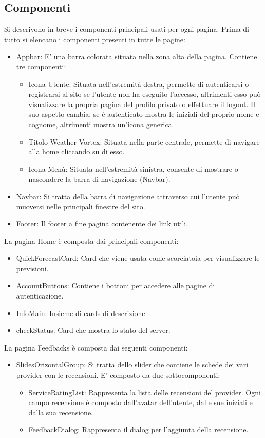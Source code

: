 \subsection{Componenti}
Si descrivono in breve i componenti principali usati per ogni pagina.
Prima di tutto si elencano i componenti presenti in tutte le pagine:
\begin{itemize}
    \item Appbar:  E' una barra colorata situata nella zona alta della pagina. Contiene tre componenti:
    \begin{itemize}
    \item Icona Utente: Situata nell'estremità destra, permette di autenticarsi o registrarsi al sito se l'utente non ha eseguito l'accesso, altrimenti esso può visualizzare la propria pagina del profilo privato o effettuare il logout. Il suo aspetto cambia: se è autenticato mostra le iniziali del proprio nome e cognome, altrimenti mostra un'icona generica. 
    \item Titolo Weather Vortex: Situata nella parte centrale, permette di navigare alla home cliccando su di esso.
    \item Icona Menù: Situata nell'estremità sinistra, consente di mostrare o nascondere la barra di navigazione (Navbar).
    \end{itemize}
    \item Navbar: Si tratta della barra di navigazione attraverso cui l'utente può muoversi nelle principali finestre del sito.
    \item Footer: Il footer a fine pagina contenente dei link utili.
\end{itemize}
La pagina Home è composta dai principali componenti:
\begin{itemize}
    \item QuickForecastCard: Card che viene usata come scorciatoia per visualizzare le previsioni. 
    \item AccountButtons: Contiene i bottoni per accedere alle pagine di autenticazione.
    \item InfoMain: Insieme di cards di descrizione
    \item checkStatus: Card che mostra lo stato del server.
\end{itemize}
La pagina Feedbacks è composta dai seguenti componenti:
\begin{itemize}
    \item SlidesOrizontalGroup: Si tratta dello slider che contiene le schede dei vari provider con le recensioni. E' composto da due sottocomponenti:
    \begin{itemize}
        \item ServiceRatingList: Rappresenta la lista delle recensioni del provider. Ogni campo recensione è composto dall'avatar dell'utente, dalle sue iniziali e dalla sua recensione.
        \item FeedbackDialog: Rappresenta il dialog per l'aggiunta della recensione.
    \end{itemize}
\end{itemize}
